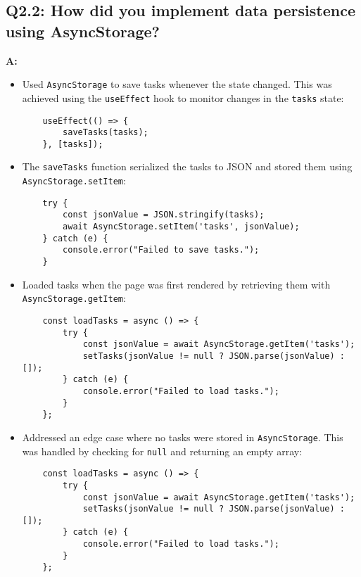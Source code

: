\documentclass{article}
\begin{document}
\subsection*{Q2.2: How did you implement data persistence using AsyncStorage?}
\textbf{A:}
\begin{itemize}
    \item Used \texttt{AsyncStorage} to save tasks whenever the state changed. This was achieved using the \texttt{useEffect} hook to monitor changes in the \texttt{tasks} state:
    \begin{verbatim}
    useEffect(() => {
        saveTasks(tasks);
    }, [tasks]);
    \end{verbatim}
    \item The \texttt{saveTasks} function serialized the tasks to JSON and stored them using \texttt{AsyncStorage.setItem}:
    \begin{verbatim}
    try {
        const jsonValue = JSON.stringify(tasks);
        await AsyncStorage.setItem('tasks', jsonValue);
    } catch (e) {
        console.error("Failed to save tasks.");
    }
    \end{verbatim}
    \item Loaded tasks when the page was first rendered by retrieving them with \texttt{AsyncStorage.getItem}:
    \begin{verbatim}
    const loadTasks = async () => {
        try {
            const jsonValue = await AsyncStorage.getItem('tasks');
            setTasks(jsonValue != null ? JSON.parse(jsonValue) : []);
        } catch (e) {
            console.error("Failed to load tasks.");
        }
    };
    \end{verbatim}
    \item Addressed an edge case where no tasks were stored in \texttt{AsyncStorage}. This was handled by checking for \texttt{null} and returning an empty array:
    \begin{verbatim}
    const loadTasks = async () => {
        try {
            const jsonValue = await AsyncStorage.getItem('tasks');
            setTasks(jsonValue != null ? JSON.parse(jsonValue) : []);
        } catch (e) {
            console.error("Failed to load tasks.");
        }
    };
    \end{verbatim}
\end{itemize}
\end{document}
